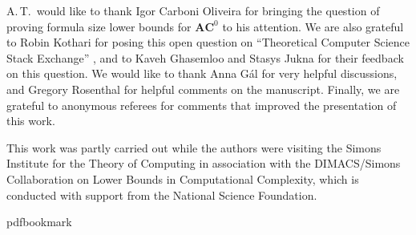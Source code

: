 \documentclass[11pt]{article}
\numberwithin{equation}{section}
\theoremstyle{definition}
\theoremstyle{plain}
\theoremstyle{definition}\newtheorem{notation}[theorem]{Notation}\theoremstyle{plain}
\newcommand{\ACz}{\boldsymbol{AC}^{0}}
\theoremstyle{definition}
\theoremstyle{plain}
\begin{document}
A.\,T.\ would like to thank Igor Carboni Oliveira for bringing the question
of proving formula size lower bounds for $\ACz$ to his attention.
We are also grateful to Robin Kothari for posing this open question
on ``Theoretical Computer Science Stack Exchange'' \cite{K11},
and to Kaveh Ghasemloo and Stasys Jukna for their feedback on this
question. We would like to thank Anna G{\'{a}}l for very helpful discussions,
and Gregory Rosenthal for helpful comments on the manuscript. Finally,
we are grateful to anonymous referees for comments that improved the
presentation of this work.

This work was partly carried out while the authors were visiting the
Simons Institute for the Theory of Computing in association with the
DIMACS/Simons Collaboration on Lower Bounds in Computational Complexity,
which is conducted with support from the National Science Foundation.


\nocite{conf-version}

\newcommand{\prelim}{Preliminary version in\ }\newcommand{\prelims}{Preliminary
  versions in\ }
\providecommand{\bibhead}[1]{}
\expandafter\ifx\csname pdfbookmark\endcsname\relax%
  \providecommand{\tocrefpdfbookmark}{}
\else\providecommand{\tocrefpdfbookmark}{%
   \hypertarget{tocreferences}{}%
   \pdfbookmark[1]{References}{tocreferences}}%
\fi
\end{document}
